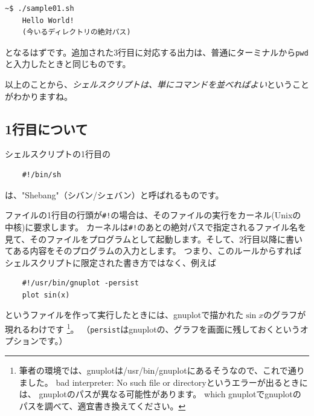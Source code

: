 \documentclass[a4j]{ltjreport}
\begin{document}
    \begin{lstlisting}[numbers=none]
    ~$ ./sample01.sh
    Hello World!
    (今いるディレクトリの絶対パス)
    \end{lstlisting}
    となるはずです。追加された3行目に対応する出力は、普通にターミナルから\texttt{pwd}と入力したときと同じものです。

    以上のことから、\emph{シェルスクリプトは、単にコマンドを並べればよい}ということがわかりますね。

    \subsection{1行目について}
    シェルスクリプトの1行目の
    \begin{lstlisting}
    #!/bin/sh
    \end{lstlisting}
    は、"Shebang"（シバン/シェバン）と呼ばれるものです。

    ファイルの1行目の行頭が\texttt{\#!}の場合は、そのファイルの実行をカーネル(Unixの中核)に要求します。
    カーネルは\texttt{\#!}のあとの絶対パスで指定されるファイル名を見て、そのファイルをプログラムとして起動します。そして、2行目以降に書いてある内容をそのプログラムの入力とします。
    つまり、このルールからすればシェルスクリプトに限定された書き方ではなく、例えば
    \begin{lstlisting}
    #!/usr/bin/gnuplot -persist
    plot sin(x)
    \end{lstlisting}
    というファイルを作って実行したときには、gnuplotで描かれた$\sin x$のグラフが現れるわけです
    \footnote{筆者の環境では、gnuplotは/usr/bin/gnuplotにあるそうなので、これで通りました。
    bad interpreter: No such file or directoryというエラーが出るときには、
    gnuplotのパスが異なる可能性があります。
    which gnuplotでgnuplotのパスを調べて、適宜書き換えてください。}。
    （\texttt{persist}はgnuplotの、グラフを画面に残しておくというオプションです。）
\end{document}
